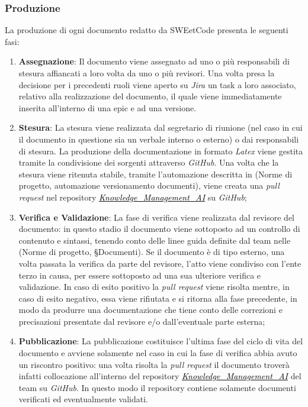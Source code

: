 \documentclass[10pt, a4paper]{article}
\begin{document}
\subsubsection{Produzione}
\label{sec:ciclo_vita}
La produzione di ogni documento redatto da SWEetCode presenta le seguenti fasi:
\begin{enumerate}
    \item \textbf{Assegnazione}: Il documento viene assegnato ad uno o più responsabili di stesura affiancati a loro volta da uno o più revisori.
    Una volta presa la decisione per i precedenti ruoli viene aperto su \textit{Jira} un task a loro associato, relativo alla  realizzazione del 
    documento, il quale viene immediatamente inserita all'interno di una epic e ad una versione. 
    \item \textbf{Stesura}: La stesura viene realizzata dal segretario di riunione (nel caso in cui il documento in questione sia un verbale 
    interno o esterno) o dai responsabili di stesura.
    La produzione della documentazione in formato \textit{Latex} viene gestita tramite la condivisione dei sorgenti attraverso \textit{GitHub}. 
    Una volta che la stesura viene ritenuta stabile, tramite l'automazione descritta in (Norme di progetto, automazione versionamento documenti), 
    viene creata una \textit{pull request} nel repository \href{https://github.com/sweetcode-team/Knowledge_Management_AI}{\textcolor{black}{\textit{Knowledge\_Management\_AI}}} 
    su \textit{GitHub};
    \item \textbf{Verifica e Validazione}: La fase di verifica viene realizzata dal revisore del documento: in questo stadio il documento viene 
    sottoposto ad un controllo di contenuto e sintassi, tenendo conto delle linee guida definite dal team nelle (Norme di progetto, \S Documenti). 
    Se il documento è di tipo esterno, una volta passata la verifica da parte del revisore, l'atto viene condiviso con l'ente terzo in causa, 
    per essere sottoposto ad una sua ulteriore verifica e validazione.
    In caso di esito positivo la \textit{pull request} viene risolta mentre, in caso di esito negativo, essa viene rifiutata e si ritorna alla 
    fase precedente, in modo da produrre una documentazione che tiene conto delle correzioni e precisazioni presentate dal revisore e/o 
    dall'eventuale parte esterna;
    \item \textbf{Pubblicazione}: La pubblicazione costituisce l'ultima fase del ciclo di vita del documento e avviene solamente nel caso in cui 
    la fase di verifica abbia avuto un riscontro positivo: una volta risolta la \textit{pull request} il documento troverà infatti collocazione 
    all'interno del repository \href{https://github.com/sweetcode-team/Knowledge_Management_AI}{\textcolor{black}{\textit{Knowledge\_Management\_AI}}} 
    del team su \textit{GitHub}. In questo modo il repository contiene solamente documenti verificati ed eventualmente validati.
\end{enumerate}
\end{document}
